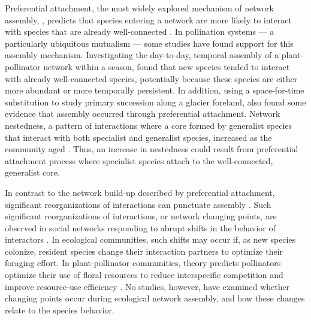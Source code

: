 \documentclass[12pt]{article}
\begin{document}
Preferential attachment, the most widely explored mechanism of network
assembly, \citep{barabasi1999emergence}, predicts that species
entering a network are more likely to interact with species that are
already well-connected \citep[''the rich-get-richer''
principle,][]{barabasi1999emergence}. In pollination systems --- a
particularly ubiquitous mutualism \citep{ollerton-2011-321,
  klein-2007-303} --- some studies have found support for this
assembly mechanism. Investigating the day-to-day, temporal assembly of
a plant-pollinator network within a season, \cite{Olesen2008} found
that new species tended to interact with already well-connected
species, potentially because these species are either more abundant or
more temporally persistent. In addition, using a space-for-time
substitution to study primary succession along a glacier foreland,
\cite{albrecht2010plant} also found some evidence that assembly
occurred through preferential attachment. Network nestedness, a
pattern of interactions where a core formed by generalist species that
interact with both specialist and generalist species, increased as the
community aged \citep{albrecht2010plant}. Thus, an increase in
nestedness could result from preferential attachment process where
specialist species attach to the well-connected, generalist
core. %

In contrast to the network build-up described by preferential
attachment, significant reorganizations of interactions can punctuate
assembly \citep{peel2014detecting}. Such significant reorganizations
of interactions, or network changing points, are observed in social
networks responding to abrupt shifts in the behavior of interactors
\citep{peel2014detecting}. In ecological communities, such shifts may
occur if, as new species colonize, resident species change their
interaction partners to optimize their foraging effort. In
plant-pollinator communities, theory predicts pollinators optimize
their use of floral resources to reduce interspecific competition and
improve resource-use efficiency \citep{pyke1984optimal,
  valdovinos2010consequences, valdovinos2013adaptive,
  albrecht2010plant, Bluthgen2007}. No studies, however, have examined
whether changing points occur during ecological network assembly, and
how these changes relate to the species behavior.
\end{document}
